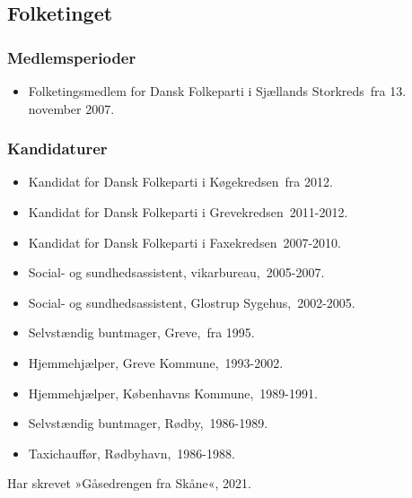 \documentclass[11pt, a4paper]{awesome-cv}
\begin{document}
\begin{cvletter}
\subsection*{Folketinget}
\subsubsection*{Medlemsperioder}
\begin{itemize}
\item Folketingsmedlem for Dansk Folkeparti i Sjællands Storkreds fra 13. november 2007.
\end{itemize}
\subsubsection*{Kandidaturer}
\begin{itemize}
\item Kandidat for Dansk Folkeparti i Køgekredsen fra 2012.
\item Kandidat for Dansk Folkeparti i Grevekredsen 2011-2012.
\item Kandidat for Dansk Folkeparti i Faxekredsen 2007-2010.
\end{itemize}
\begin{itemize}
\item Social- og sundhedsassistent, vikarbureau, 2005-2007.
\item Social- og sundhedsassistent, Glostrup Sygehus, 2002-2005.
\item Selvstændig buntmager, Greve, fra 1995.
\item Hjemmehjælper, Greve Kommune, 1993-2002.
\item Hjemmehjælper, Københavns Kommune, 1989-1991.
\item Selvstændig buntmager, Rødby, 1986-1989.
\item Taxichauffør, Rødbyhavn, 1986-1988.
\end{itemize}
Har skrevet »Gåsedrengen fra Skåne«, 2021.

\end{cvletter}
\end{document}
